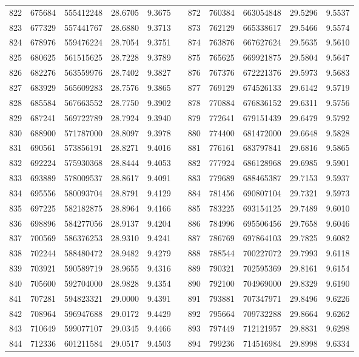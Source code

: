 \begin{longtable}{rrrrrrrrrrr}
822&675684&555412248&28.6705&9.3675&&872&760384&663054848&29.5296&9.5537\\
823&677329&557441767&28.6880&9.3713&&873&762129&665338617&29.5466&9.5574\\
824&678976&559476224&28.7054&9.3751&&874&763876&667627624&29.5635&9.5610\\
825&680625&561515625&28.7228&9.3789&&875&765625&669921875&29.5804&9.5647\\
826&682276&563559976&28.7402&9.3827&&876&767376&672221376&29.5973&9.5683\\
827&683929&565609283&28.7576&9.3865&&877&769129&674526133&29.6142&9.5719\\
828&685584&567663552&28.7750&9.3902&&878&770884&676836152&29.6311&9.5756\\
829&687241&569722789&28.7924&9.3940&&879&772641&679151439&29.6479&9.5792\\
830&688900&571787000&28.8097&9.3978&&880&774400&681472000&29.6648&9.5828\\
831&690561&573856191&28.8271&9.4016&&881&776161&683797841&29.6816&9.5865\\
832&692224&575930368&28.8444&9.4053&&882&777924&686128968&29.6985&9.5901\\
833&693889&578009537&28.8617&9.4091&&883&779689&688465387&29.7153&9.5937\\
834&695556&580093704&28.8791&9.4129&&884&781456&690807104&29.7321&9.5973\\
835&697225&582182875&28.8964&9.4166&&885&783225&693154125&29.7489&9.6010\\
836&698896&584277056&28.9137&9.4204&&886&784996&695506456&29.7658&9.6046\\
837&700569&586376253&28.9310&9.4241&&887&786769&697864103&29.7825&9.6082\\
838&702244&588480472&28.9482&9.4279&&888&788544&700227072&29.7993&9.6118\\
839&703921&590589719&28.9655&9.4316&&889&790321&702595369&29.8161&9.6154\\
840&705600&592704000&28.9828&9.4354&&890&792100&704969000&29.8329&9.6190\\
841&707281&594823321&29.0000&9.4391&&891&793881&707347971&29.8496&9.6226\\
842&708964&596947688&29.0172&9.4429&&892&795664&709732288&29.8664&9.6262\\
843&710649&599077107&29.0345&9.4466&&893&797449&712121957&29.8831&9.6298\\
844&712336&601211584&29.0517&9.4503&&894&799236&714516984&29.8998&9.6334\\

\end{longtable}
